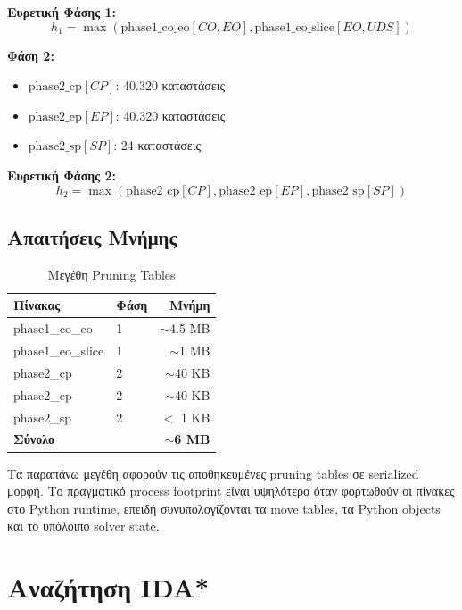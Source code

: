 \textbf{Ευρετική Φάσης 1:}
\begin{equation}
    h_1 = \max(\text{phase1\_co\_eo}[CO, EO], \text{phase1\_eo\_slice}[EO, UDS])
\end{equation}

\textbf{Φάση 2:}
\begin{itemize}
    \item $\text{phase2\_cp}[CP]$: 40.320 καταστάσεις
    \item $\text{phase2\_ep}[EP]$: 40.320 καταστάσεις
    \item $\text{phase2\_sp}[SP]$: 24 καταστάσεις
\end{itemize}

\textbf{Ευρετική Φάσης 2:}
\begin{equation}
    h_2 = \max(\text{phase2\_cp}[CP], \text{phase2\_ep}[EP], \text{phase2\_sp}[SP])
\end{equation}

\subsection{Απαιτήσεις Μνήμης}

\begin{table}[h]
\centering
\caption{Μεγέθη Pruning Tables}
\label{tab:pruning_sizes}
\begin{tabular}{llr}
\toprule
\textbf{Πίνακας} & \textbf{Φάση} & \textbf{Μνήμη} \\
\midrule
phase1\_co\_eo & 1 & $\sim$4.5 MB \\
phase1\_eo\_slice & 1 & $\sim$1 MB \\
phase2\_cp & 2 & $\sim$40 KB \\
phase2\_ep & 2 & $\sim$40 KB \\
phase2\_sp & 2 & $<$ 1 KB \\
\midrule
\textbf{Σύνολο} & & $\sim$\textbf{6 MB} \\
\bottomrule
\end{tabular}
\end{table}

Τα παραπάνω μεγέθη αφορούν τις αποθηκευμένες pruning tables σε serialized
μορφή. Το πραγματικό process footprint είναι υψηλότερο όταν φορτωθούν οι πίνακες
στο Python runtime, επειδή συνυπολογίζονται τα move tables, τα Python objects και
το υπόλοιπο solver state.


\section{Αναζήτηση IDA*}
\label{sec:kociemba_ida}

